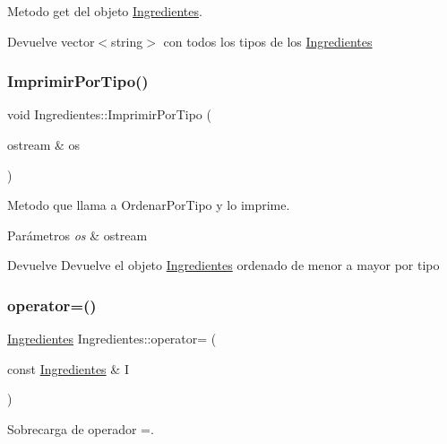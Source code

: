 Metodo get del objeto \hyperlink{classIngredientes}{Ingredientes}. 

\begin{DoxyReturn}{Devuelve}
vector$<$string$>$ con todos los tipos de los \hyperlink{classIngredientes}{Ingredientes} 
\end{DoxyReturn}
\mbox{\label{classIngredientes_a9a3accd03d7af199cd1ee99350ab5626}} 
\subsubsection{\texorpdfstring{Imprimir\+Por\+Tipo()}{ImprimirPorTipo()}}
{\footnotesize\ttfamily void Ingredientes\+::\+Imprimir\+Por\+Tipo (\begin{DoxyParamCaption}\item[{ostream \&}]{os }\end{DoxyParamCaption})}



Metodo que llama a Ordenar\+Por\+Tipo y lo imprime. 


\begin{DoxyParams}{Parámetros}
{\em os} & ostream \\
\hline
\end{DoxyParams}
\begin{DoxyReturn}{Devuelve}
Devuelve el objeto \hyperlink{classIngredientes}{Ingredientes} ordenado de menor a mayor por tipo 
\end{DoxyReturn}
\mbox{\label{classIngredientes_a62ad2bb49e19ce82df5d04fe94081e9c}} 
\subsubsection{\texorpdfstring{operator=()}{operator=()}}
{\footnotesize\ttfamily \hyperlink{classIngredientes}{Ingredientes} Ingredientes\+::operator= (\begin{DoxyParamCaption}\item[{const \hyperlink{classIngredientes}{Ingredientes} \&}]{I }\end{DoxyParamCaption})}



Sobrecarga de operador =. 


